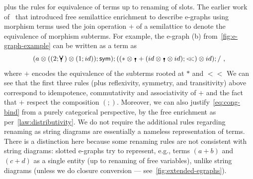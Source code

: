 	plus the rules for equivalence of terms up to renaming of slots.
	The earlier work of~\citet{tiurin2025equivalencehypergraphsdporewriting} that introduced free semilattice enrichment to describe e-graphs using morphism terms used the join operation $+$ of a semilattice to denote the equivalence of morphism subterms.
	For example, the e-graph (b) from~\autoref{fig:e-graph-example} can be written as a term as
	\[(a \otimes ((2;\comonoid) \otimes (1;id));\sym);((* \otimes \counit + (id \otimes \counit \otimes id);<\!\!<) \otimes id);/~,\] where $+$ encodes the equivalence of the subterms rooted at $*$ and $<\!\!<$
	We can see that the first three rules (plus reflexivity, symmetry, and transitivity) above correspond to idempotence, commutativity and associativity of $+$ and the fact that $+$ respect the composition $(;)$.
	Moreover, we can also justify~\autoref{eq:cong-bind} from a purely categorical perspective, by the free enrichment as per~\autoref{law:distributivity}.
	We do not require the additional rules regarding renaming as string diagrams are essentially a nameless representation of terms.
	There is a distinction here because some renaming rules are not consistent with string diagrams: slotted e-graphs try to represent, e.g., terms $(a + b)$ and $(c + d)$ as a single entity (up to renaming of free variables), unlike string diagrams (unless we do closure conversion --- see~\autoref{fig:extended-egraphs}).


